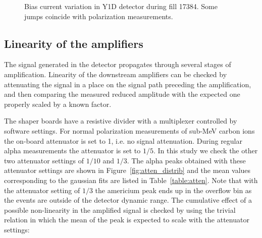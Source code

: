\documentclass[a4paper,12pt]{article}
\begin{document}
\begin{figure}[p]
\caption{Bias current variation in Y1D detector during fill 17384. Some jumps
coincide with polarization measurements.}
\label{fig:bc_jumping}
\end{figure}

\subsection{Linearity of the amplifiers}

The signal generated in the detector propagates through several stages of
amplification. Linearity of the downstream amplifiers can be checked by
attenuating the signal in a place on the signal path preceding the
amplification, and then comparing the measured reduced amplitude with the
expected one properly scaled by a known factor.

The shaper boards have a resistive divider with a multiplexer controlled by
software settings. For normal polarization measurements of sub-MeV carbon ions
the on-board attenuator is set to 1, i.e. no signal attenuation. During regular
alpha measurements the attenuator is set to $1/5$. In this study we check the
other two attenuator settings of $1/10$ and $1/3$. The alpha peaks obtained with
these attenuator settings are shown in Figure~\ref{fig:atten_distrib} and the
mean values corresponding to the gaussian fits are listed in
Table~\ref{table:atten}. Note that with the attenuator setting of $1/3$ the
americium peak ends up in the overflow bin as the events are outside of the detector
dynamic range. The cumulative effect of a possible non-linearity in the
amplified signal is checked by using the trivial relation in which the mean of
the peak is expected to scale with the attenuator settings:
\end{document}
